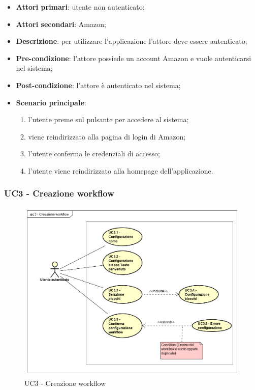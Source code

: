 \begin{itemize}
\item \textbf{Attori primari}: utente non autenticato;

\item \textbf{Attori secondari}: Amazon;

\item \textbf{Descrizione}: per utilizzare l'applicazione l'attore deve essere autenticato;

\item \textbf{Pre-condizione}: l'attore possiede un account Amazon e vuole autenticarsi nel sistema;

\item \textbf{Post-condizione}: l'attore è autenticato nel sistema;

\item \textbf{Scenario principale}:
\begin{enumerate}
\item l'utente preme sul pulsante per accedere al sistema;
\item viene reindirizzato alla pagina di login di Amazon;
\item l'utente conferma le credenziali di accesso;
\item l'utente viene reindirizzato alla homepage dell'applicazione.

\end{enumerate}

\end{itemize}
\pagebreak
\subsubsection{UC3 - Creazione workflow}

\begin{figure}[H]
\centering
\includegraphics[scale=0.6]{immagini/UC3}
\caption{UC3 - Creazione workflow \label{fig:UC3}}
\end{figure}

